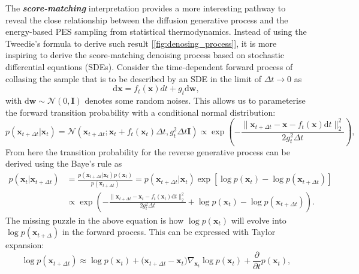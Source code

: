 The \emph{\textbf{score-matching}}\cite{song2020score} interpretation provides a more interesting pathway to reveal the close relationship between the diffusion generative process and the energy-based PES sampling from statistical thermodynamics.\cite{sohl2015deep} Instead of using the Tweedie's formula to derive such result [\cref{fig:denosing_process}]\cite{luo2022understanding}, it is more inspiring to derive the score-matching denoising process based on stochastic differential equations (SDEs). Consider the time-dependent forward process of collasing the sample that is to be described by an SDE in the limit of $\Delta t\to0$ as 
\begin{equation}
    \label{eq:diffusion_forward_SDE}
    \mathrm{d}\bm{x}=f_t(\bm{x})dt+g_t \mathrm{d}\boldsymbol{w},
\end{equation}
 with $\mathrm{d}\boldsymbol{w}\sim\mathcal{N}(0,\bm{I})$ denotes some random noises. This allows us to parameterise the forward transition probability with a conditional normal distribution: 
\begin{equation}
    p(\bm{x}_{t+\Delta t}|\bm{x}_t)=\mathcal{N}\left( \bm{x}_{t+\Delta t}; \bm{x}_t+f_t(\bm{x}_t)\Delta t,g_t^2\Delta t\bm{I}\right)
    \propto \exp\left(-\frac{\| \bm{x}_{t+\Delta t}-\bm{x}-f_t(\bm{x})\mathrm{d}t\|_2^2}{2g_t^2\Delta t}\right),\label{eq:forward_prob_SDR}
\end{equation}
From here the transition probability for the reverse generative process can be derived using the Baye's rule as
\begin{align}
  p(\bm{x}_t|\bm{x}_{t+\Delta t})&=\frac{p(\bm{x}_{t+\Delta t}|\bm{x}_t) p(\bm{x}_t)} {p(\bm{x}_{t+\Delta t})} = p(\bm{x}_{t+\Delta t}|\bm{x}_t)\exp\left[ \log p(\bm{x}_t) - \log p(\bm{x}_{t+\Delta t}) \right] \nonumber\\
  &\propto \exp \left( -\frac{\| \bm{x}_{t+\Delta t}-\bm{x}_t-f_t(\bm{x}_t)\mathrm{d}t\|_2^2}{2g_t^2\Delta t}   + \log p(\bm{x}_t) - \log p(\bm{x}_{t+\Delta t}) \right).\label{eq:reverse_prob_Bayes}
\end{align}
The missing puzzle in the above equation is how $\log p(\bm{x}_t)$ will evolve into $\log p(\bm{x}_{t+\Delta})$ in the forward process. This can be expressed with Taylor expansion:
\begin{equation}
    \label{eq:taylor_exp_probability_diffusion}
    \log p(\bm{x}_{t+\Delta t    }) \approx \log p(\bm{x}_t)+\big(\bm{x}_{t+\Delta t}-\bm{x}_t \big)\nabla_{\bm{x}_t}\log p(\bm{x}_t)+\frac{\partial}{\partial t}p(\bm{x}_t),
\end{equation}
